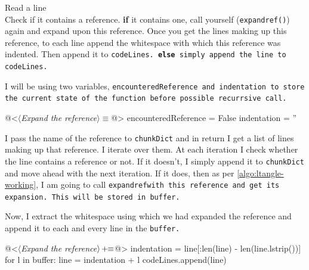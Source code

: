 \begin{algorithm}
Read a line\\
Check if it contains a reference. \linebreak
\textbf{if} it contains one, call yourself (\texttt{expandref()}) again and expand
upon this reference. Once you get the lines making up this reference, to each line append the whitespace with
which this reference was indented. Then append it to \tt codeLines.\rm\linebreak
\textbf{else} simply append the line to \tt codeLines\rm.

\caption{Pseudocode for \texttt{ltangle.py}}
\label{algo:ltangle-working}
\end{algorithm}

I will be using two variables, \tt encounteredReference \rm and \texttt{indentation} to store the current
state of the function before possible recurrsive call.

\begin{code}
@<$\langle$\textit{Expand the reference}$\rangle\equiv$@>
encounteredReference = False
indentation = ''
\end{code}

I pass the name of the reference to \texttt{chunkDict} and in return I get a list of lines making up that
reference. I iterate over them. At each iteration I check whether the line contains a reference or not. If it
doesn't, I simply append it to \texttt{chunkDict} and move ahead with the next iteration. If it does, then as
per \ref{algo:ltangle-working}, I am going to call \tt expandref\rm with this reference and get its expansion.
This will be stored in \tt buffer\rm.


Now, I extract the whitespace using which we had expanded the reference and append it to each and every line
in the \tt buffer\rm.
\begin{oldcode}
@<$\langle$\textit{Expand the reference}$\rangle \thinspace +\!\!\equiv$@>
        indentation = line[:len(line) - len(line.lstrip())]
        for l in buffer:
            line = indentation + l
            codeLines.append(line)
\end{oldcode}

